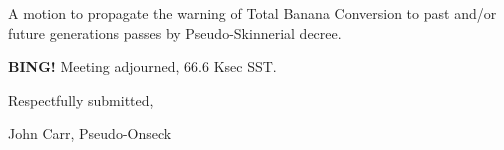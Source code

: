 \documentclass[10pt]{article}
\newcommand{\bing}{{\bf BING!} }
\begin{document}
A motion to propagate the warning of Total Banana Conversion to past and/or
future generations passes by Pseudo-Skinnerial decree.

\bing
\noindent
Meeting adjourned, 66.6 Ksec SST.

\vspace{18pt}

\centerline{Respectfully submitted,}
\centerline{John Carr, Pseudo-Onseck}
\end{document}

